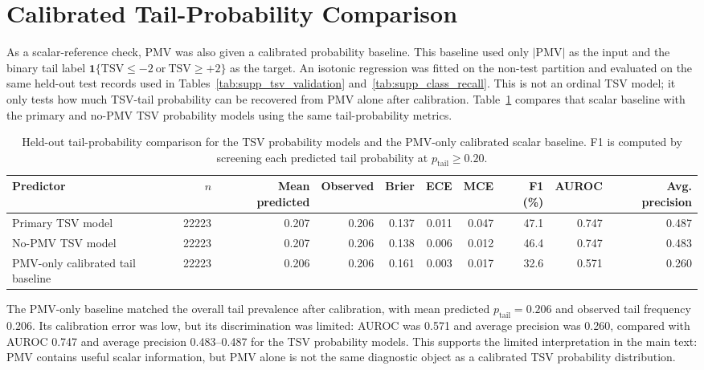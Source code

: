 \documentclass[11pt]{article}
\begin{document}
\section{Calibrated Tail-Probability Comparison}

As a scalar-reference check, PMV was also given a calibrated probability baseline. This baseline used only $|\mathrm{PMV}|$ as the input and the binary tail label $\mathbf{1}\{\mathrm{TSV}\le-2\ \mathrm{or}\ \mathrm{TSV}\ge+2\}$ as the target. An isotonic regression was fitted on the non-test partition and evaluated on the same held-out test records used in Tables~\ref{tab:supp_tsv_validation} and~\ref{tab:supp_class_recall}. This is not an ordinal TSV model; it only tests how much TSV-tail probability can be recovered from PMV alone after calibration. Table~\ref{tab:supp_tail_probability_comparison} compares that scalar baseline with the primary and no-PMV TSV probability models using the same tail-probability metrics.

\begin{table}[htbp]
\centering
\caption{Held-out tail-probability comparison for the TSV probability models and the PMV-only calibrated scalar baseline. F1 is computed by screening each predicted tail probability at $p_{\mathrm{tail}}\ge0.20$.}
\label{tab:supp_tail_probability_comparison}
\scriptsize
\setlength{\tabcolsep}{3.2pt}
\begin{tabular}{lrrrrrrrrr}
\toprule
Predictor & $n$ & Mean predicted & Observed & Brier & ECE & MCE & F1 (\%) & AUROC & Avg. precision \\
\midrule
Primary TSV model & 22223 & 0.207 & 0.206 & 0.137 & 0.011 & 0.047 & 47.1 & 0.747 & 0.487 \\
No-PMV TSV model & 22223 & 0.207 & 0.206 & 0.138 & 0.006 & 0.012 & 46.4 & 0.747 & 0.483 \\
PMV-only calibrated tail baseline & 22223 & 0.206 & 0.206 & 0.161 & 0.003 & 0.017 & 32.6 & 0.571 & 0.260 \\
\bottomrule
\end{tabular}
\end{table}

The PMV-only baseline matched the overall tail prevalence after calibration, with mean predicted $p_{\mathrm{tail}}=0.206$ and observed tail frequency $0.206$. Its calibration error was low, but its discrimination was limited: AUROC was 0.571 and average precision was 0.260, compared with AUROC 0.747 and average precision 0.483--0.487 for the TSV probability models. This supports the limited interpretation in the main text: PMV contains useful scalar information, but PMV alone is not the same diagnostic object as a calibrated TSV probability distribution.
\end{document}
